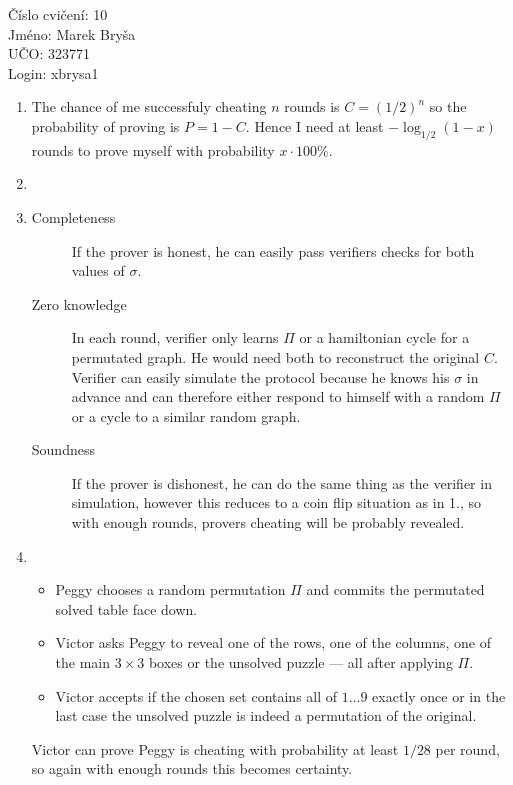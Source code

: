 \documentclass[a4paper,10pt]{extarticle}
\begin{document}
\begin{flushleft}
Číslo cvičení: 10 \\ 
Jméno: Marek Bryša \\
UČO: 323771\\
Login: xbrysa1\\
\end{flushleft}
\begin{enumerate}
  \item
    The chance of me successfuly cheating $n$ rounds is $C=(1/2)^n$ so the probability of proving is $P=1-C$. Hence I need at least $-\log_{1/2}(1-x)$ rounds to prove myself with probability $x\cdot 100\%$.
  \item
  \item
    \begin{description}
      \item[Completeness]
        If the prover is honest, he can easily pass verifiers checks for both values of $\sigma$.
      \item[Zero knowledge]
        In each round, verifier only learns $\Pi$ or a hamiltonian cycle for a permutated graph. He would need both to reconstruct the original $C$. Verifier can easily simulate the protocol because he knows his $\sigma$ in advance and can therefore either respond to himself with a random $\Pi$ or a cycle to a similar random graph.
      \item[Soundness]
        If the prover is dishonest, he can do the same thing as the verifier in simulation, however this reduces to a coin flip situation as in 1., so with enough rounds, provers cheating will be probably revealed.
    \end{description}
  \item
    \begin{itemize}
      \item
        Peggy chooses a random permutation $\Pi$ and commits the permutated solved table face down.
      \item
        Victor asks Peggy to reveal one of the rows, one of the columns, one of the main $3\times 3$ boxes or the unsolved puzzle --- all after applying $\Pi$.
      \item
        Victor accepts if the chosen set contains all of $1\dots 9$ exactly once or in the last case the unsolved puzzle is indeed a permutation of the original.
    \end{itemize}
    Victor can prove Peggy is cheating with probability at least $1/28$ per round, so again with enough rounds this becomes certainty.
\end{enumerate}
\end{document}
